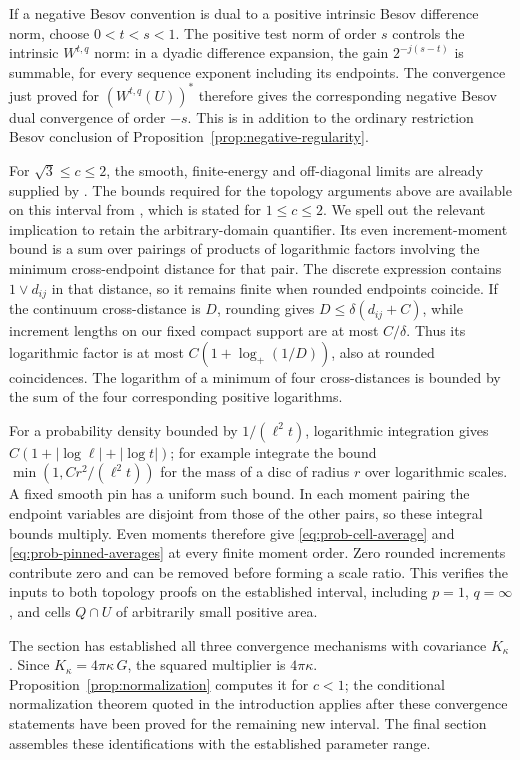 \begin{remark}
If a negative Besov convention is dual to a positive intrinsic Besov
difference norm, choose \(0<t<s<1\). The positive test norm of order
\(s\) controls the intrinsic \(W^{t,q}\) norm: in a dyadic difference
expansion, the gain \(2^{-j(s-t)}\) is summable, for every sequence
exponent including its endpoints. The convergence just proved for
\((W^{t,q}(U))^*\) therefore gives the corresponding negative Besov
dual convergence of order \(-s\). This is in addition to the ordinary
restriction Besov conclusion of Proposition~\ref{prop:negative-regularity}.

For \(\sqrt3\le c\le2\), the smooth, finite-energy and off-diagonal
limits are already supplied by \cite[Theorem~2.8]{DKLM2026}.
The bounds required for the topology arguments above are available on
this interval from \cite[Theorem~4.5]{DKLM2026}, which is stated for
\(1\le c\le2\). We spell out the relevant implication to retain the
arbitrary-domain quantifier. Its even increment-moment bound is a sum
over pairings of products of logarithmic factors involving the minimum
cross-endpoint distance for that pair. The discrete expression contains
\(1\vee d_{ij}\) in that distance, so it remains finite when rounded
endpoints coincide. If the continuum cross-distance is \(D\), rounding
gives \(D\le\delta(d_{ij}+C)\), while increment lengths on our fixed
compact support are at most \(C/\delta\). Thus its logarithmic factor
is at most \(C(1+\log_+(1/D))\), also at rounded coincidences.
The logarithm of a minimum of four cross-distances is bounded by the
sum of the four corresponding positive logarithms.

For a probability density bounded by \(1/(\ell^2t)\), logarithmic
integration gives
\(C(1+|\log\ell|+|\log t|)\); for example integrate the bound
\(\min(1,C r^2/(\ell^2t))\) for the mass of a disc of radius \(r\)
over logarithmic scales. A fixed smooth pin has a uniform such bound.
In each moment pairing the endpoint variables are disjoint from those
of the other pairs, so these integral bounds multiply. Even moments
therefore give \eqref{eq:prob-cell-average} and
\eqref{eq:prob-pinned-averages} at every finite moment order.
Zero rounded increments contribute zero and can be removed before
forming a scale ratio. This verifies the inputs to both topology proofs
on the established interval, including \(p=1\), \(q=\infty\), and
cells \(Q\cap U\) of arbitrarily small positive area.
\end{remark}

The section has established all three convergence mechanisms with
covariance \(K_\kappa\). Since
\(K_\kappa=4\pi\kappa\,G\), the squared multiplier is
\(4\pi\kappa\). Proposition~\ref{prop:normalization} computes it for
\(c<1\); the conditional normalization theorem quoted in the
introduction applies after these convergence statements have been
proved for the remaining new interval. The final section assembles
these identifications with the established parameter range.
